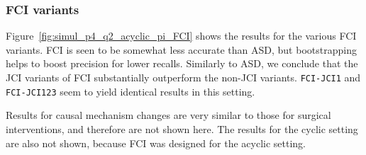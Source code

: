 \documentclass[twoside,11pt]{article}
\newcommand{\alg}[1]{\texttt{#1}}
\begin{document}
\subsubsection{FCI variants}

Figure~\ref{fig:simul_p4_q2_acyclic_pi_FCI} shows the results for the various
FCI variants. FCI is seen to be somewhat less accurate 
than ASD, but bootstrapping helps to boost precision for lower recalls. 
Similarly to ASD, we conclude that the JCI variants of FCI substantially
outperform the non-JCI variants. 
\alg{FCI-JCI1} and \alg{FCI-JCI123} seem to yield identical results in this setting. 

Results for causal mechanism changes are very similar to those for surgical 
interventions, and therefore are not shown here. The results for the cyclic 
setting are also not shown, because FCI was designed for the acyclic setting.
\end{document}
